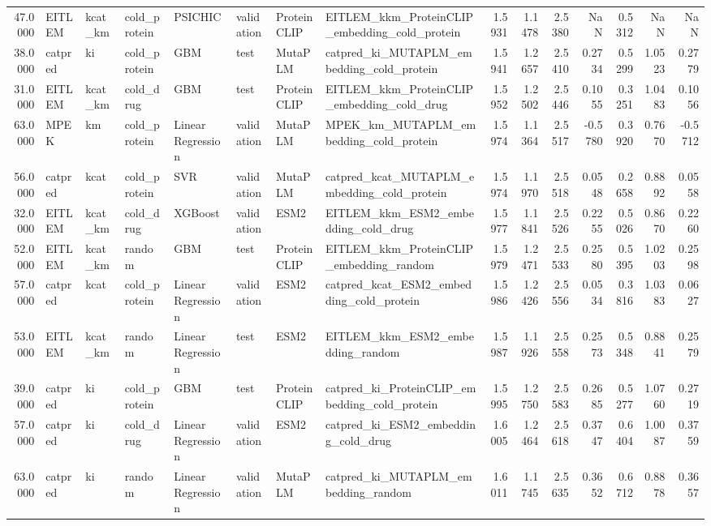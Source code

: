 \begin{tabular}{rlllllllrrrrrrr}
47.0000 & EITLEM & kcat_km & cold_protein & PSICHIC & validation & ProteinCLIP & EITLEM_kkm_ProteinCLIP_embedding_cold_protein & 1.5931 & 1.1478 & 2.5380 & NaN & 0.5312 & NaN & NaN \\
38.0000 & catpred & ki & cold_protein & GBM & test & MutaPLM & catpred_ki_MUTAPLM_embedding_cold_protein & 1.5941 & 1.2657 & 2.5410 & 0.2734 & 0.5299 & 1.0523 & 0.2779 \\
31.0000 & EITLEM & kcat_km & cold_drug & GBM & test & ProteinCLIP & EITLEM_kkm_ProteinCLIP_embedding_cold_drug & 1.5952 & 1.2502 & 2.5446 & 0.1055 & 0.3251 & 1.0483 & 0.1056 \\
63.0000 & MPEK & km & cold_protein & Linear Regression & validation & MutaPLM & MPEK_km_MUTAPLM_embedding_cold_protein & 1.5974 & 1.1364 & 2.5517 & -0.5780 & 0.3920 & 0.7670 & -0.5712 \\
56.0000 & catpred & kcat & cold_protein & SVR & validation & MutaPLM & catpred_kcat_MUTAPLM_embedding_cold_protein & 1.5974 & 1.1970 & 2.5518 & 0.0548 & 0.2658 & 0.8892 & 0.0558 \\
32.0000 & EITLEM & kcat_km & cold_drug & XGBoost & validation & ESM2 & EITLEM_kkm_ESM2_embedding_cold_drug & 1.5977 & 1.1841 & 2.5526 & 0.2255 & 0.5026 & 0.8670 & 0.2260 \\
52.0000 & EITLEM & kcat_km & random & GBM & test & ProteinCLIP & EITLEM_kkm_ProteinCLIP_embedding_random & 1.5979 & 1.2471 & 2.5533 & 0.2580 & 0.5395 & 1.0203 & 0.2598 \\
57.0000 & catpred & kcat & cold_protein & Linear Regression & validation & ESM2 & catpred_kcat_ESM2_embedding_cold_protein & 1.5986 & 1.2426 & 2.5556 & 0.0534 & 0.3816 & 1.0383 & 0.0627 \\
53.0000 & EITLEM & kcat_km & random & Linear Regression & test & ESM2 & EITLEM_kkm_ESM2_embedding_random & 1.5987 & 1.1926 & 2.5558 & 0.2573 & 0.5348 & 0.8841 & 0.2579 \\
39.0000 & catpred & ki & cold_protein & GBM & test & ProteinCLIP & catpred_ki_ProteinCLIP_embedding_cold_protein & 1.5995 & 1.2750 & 2.5583 & 0.2685 & 0.5277 & 1.0760 & 0.2719 \\
57.0000 & catpred & ki & cold_drug & Linear Regression & validation & ESM2 & catpred_ki_ESM2_embedding_cold_drug & 1.6005 & 1.2464 & 2.5618 & 0.3747 & 0.6404 & 1.0087 & 0.3759 \\
63.0000 & catpred & ki & random & Linear Regression & validation & MutaPLM & catpred_ki_MUTAPLM_embedding_random & 1.6011 & 1.1745 & 2.5635 & 0.3652 & 0.6712 & 0.8878 & 0.3657 \\

\end{tabular}

